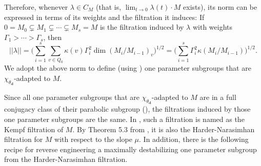 \documentclass[a4paper]{amsart}
\numberwithin{equation}{section}
\theoremstyle{plain}
\theoremstyle{definition}
\begin{document}
Therefore, whenever $\lambda\in C_M$ (that is, $\lim_{t\rightarrow 0}\lambda(t)\cdot M$ exists), its norm can be expressed in terms of its weights and the filtration it induces: If $0=M_0\subsetneq M_1\subsetneq\cdots\subsetneq M_s=M$ is the filtration induced by $\lambda$ with weights $\Gamma_1>\cdots>\Gamma _s$, then \begin{equation}\label{weighted_norm_grouped_by_filtration}||\lambda||=\big(\sum_{i=1}^{s}\sum_{v\in Q_0}\kappa(v)\Gamma_i^2\dim (M_{i}/M_{i-1})_v\big)^{1/2}=\big(\sum_{i=1}^{s}\Gamma_i^2\kappa(M_{i}/M_{i-1})\big)^{1/2}.\end{equation}
We adopt the above norm to define (using ) one parameter subgroups that are $\chi_{\theta_{\mathbf{d}}}$-adapted to $M$.

Since all one parameter subgroups that are $\chi_{\theta_{\mathbf{d}}}$-adapted to $M$ are in a full conjugacy class of their parabolic subgroup (), the filtrations induced by those one parameter subgroups are the same. In \cite{MR3199484}, such a filtration is named as the Kempf filtration of $M$. By Theorem 5.3 from \cite{MR3199484}, it is also the Harder-Narasimhan filtration for $M$ with respect to the slope $\mu$. In addition, there is the following recipe for reverse engineering a maximally destabilizing one parameter subgroup from the Harder-Narasimhan filtration. 
\end{document}
